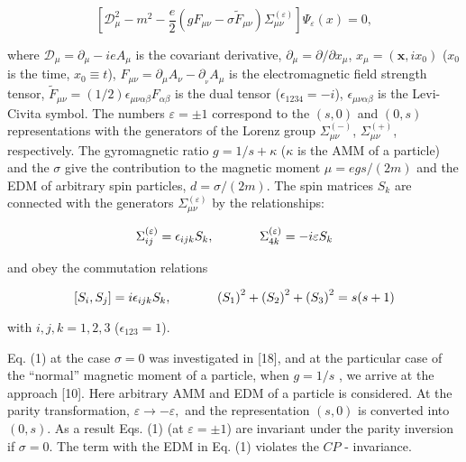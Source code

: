 \documentclass[a4paper,12pt]{article}
\begin{document}
\begin{equation}
\left[ \mathcal{D}_\mu ^2-m^2-\frac e2\left( gF_{\mu \nu }-\sigma \widetilde{
F}_{\mu \nu }\right) \Sigma _{\mu \nu }^{(\varepsilon )}\right] \Psi
_\varepsilon (x)=0,  \label{1}
\end{equation}

where $\mathcal{D}_\mu =\partial _\mu -ieA_\mu $ is the covariant
derivative, $\partial _\mu =\partial /\partial x_\mu $, $x_\mu =(\mathbf{x}
,ix_0)$ ($x_0$ is the time, $x_0\equiv t$), $F_{\mu \nu }=\partial _\mu
A_\nu -\partial _{_\nu }A_\mu $ is the electromagnetic field strength
tensor, $\widetilde{F}_{\mu \nu }=(1/2)\epsilon _{\mu \nu \alpha \beta
}F_{\alpha \beta }$ is the dual tensor ($\epsilon _{1234}=-i$), $\epsilon
_{\mu \nu \alpha \beta }$ is the Levi-Civita symbol. The numbers $%
\varepsilon =\pm 1$ correspond to the $\left( s,0\right) $ and $\left(
0,s\right) $ representations with the generators of the Lorenz group $\Sigma
_{\mu \nu }^{\left( -\right) }$, $\Sigma _{\mu \nu }^{\left( +\right) }$,
respectively. The gyromagnetic ratio $g=1/s+\kappa $ ($\kappa $ is the AMM
of a particle) and the $\sigma $ give the contribution to the magnetic
moment $\mu =egs/(2m)$ and the EDM of arbitrary spin particles, $d=\sigma
/(2m)$. The spin matrices $S_k$ are connected with the generators $%
\Sigma_{\mu \nu }^{(\varepsilon )}$ by the relationships:

\begin{equation}
\Sigma _{ij}^{(\varepsilon )}=\epsilon _{ijk}S_k,\hspace{0.5in}\Sigma
_{4k}^{(\varepsilon )}=-i\varepsilon S_k  \label{2}
\end{equation}

and obey the commutation relations

\begin{equation}
\left[ S_i,S_j\right] =i\epsilon _{ijk}S_k,\hspace{0.5in}\left( S_1\right)
^2+\left( S_2\right) ^2+\left( S_3\right) ^2=s(s+1)  \label{3}
\end{equation}

with $i,j,k=1,2,3$ ($\epsilon _{123}=1$).

Eq. (1) at the case $\sigma =0$ was investigated in [18], and at
the particular case of the ``normal'' magnetic moment of a
particle, when $g=1/s$ , we arrive at the approach [10]. Here
arbitrary AMM and EDM of a particle is considered. At the parity
transformation, $\varepsilon \rightarrow -\varepsilon ,$ and the
representation $(s,0)$ is converted into $(0,s)$. As a result Eqs.
(1) (at $\varepsilon =\pm 1$) are invariant under the parity
inversion if $\sigma =0$. The term with the EDM in Eq. (1)
violates the $CP$ - invariance.
\end{document}
